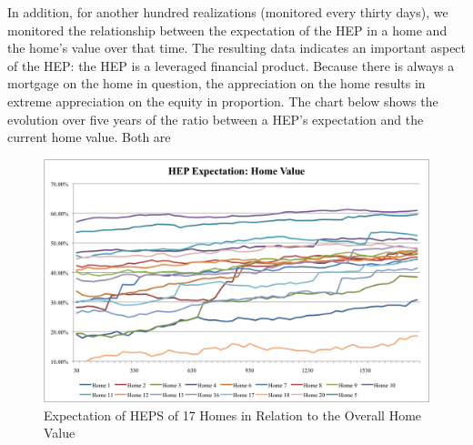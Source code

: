 \documentclass[twoside]{article}
\begin{document}
In addition, for another hundred realizations (monitored every thirty days), we monitored the relationship between the expectation of the HEP in a home and the home's value over that time. The resulting data indicates an important aspect of the HEP: the HEP is a leveraged financial product. Because there is always a mortgage on the home in question, the appreciation on the home results in extreme appreciation on the equity in proportion. The chart below shows the evolution over five years of the ratio between a HEP's expectation and the current home value. Both are
\begin{figure}
\centering
\includegraphics[scale=.55]{HepExpHVal.png}
\caption{Expectation of HEPS of 17 Homes in Relation to the Overall Home Value}
\end{figure}


\end{document}
